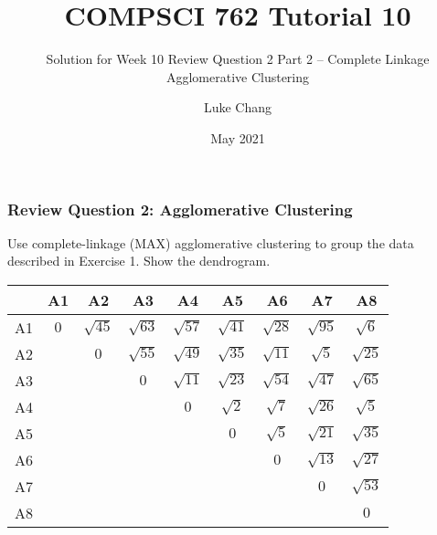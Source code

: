 \documentclass[aspectratio=169, 10pt]{beamer}
\title{COMPSCI 762 Tutorial 10}
\subtitle{Solution for Week 10 Review Question 2 Part 2 -- Complete Linkage Agglomerative Clustering}
\author{Luke Chang}
\institute{The University of Auckland}
\date{May 2021}
\begin{document}
\frame{\titlepage}

\begin{frame}[t]
    \frametitle{Review Question 2: Agglomerative Clustering}
    \small
    Use complete-linkage (MAX) agglomerative clustering to group the data described in Exercise 1. Show the dendrogram.
    \begin{table}[]
        \scriptsize
        \begin{tabular}{c|cccccccc}
           & A1 & A2 & A3 & A4 & A5 & A6 & A7 & A8 \\ \hline
        A1 & $0$  & $\sqrt{45}$ & $\sqrt{63}$ & $\sqrt{57}$ & $\sqrt{41}$ & $\sqrt{28}$ & $\sqrt{95}$ & $\sqrt{6}$ \\
        A2 &    & $0$  & $\sqrt{55}$ & $\sqrt{49}$ & $\sqrt{35}$ & $\sqrt{11}$ & $\sqrt{5}$  & $\sqrt{25}$ \\
        A3 &    &    & $0$  & $\sqrt{11}$ & $\sqrt{23}$ & $\sqrt{54}$ & $\sqrt{47}$ & $\sqrt{65}$ \\
        A4 &    &    &    & $0$  & $\sqrt{2}$  & $\sqrt{7}$  & $\sqrt{26}$ & $\sqrt{5}$  \\
        A5 &    &    &    &    & $0$  & $\sqrt{5}$  & $\sqrt{21}$ & $\sqrt{35}$ \\
        A6 &    &    &    &    &    & $0$  & $\sqrt{13}$ & $\sqrt{27}$ \\
        A7 &    &    &    &    &    &    & $0$  & $\sqrt{53}$ \\
        A8 &    &    &    &    &    &    &    & $0$ \\
        \end{tabular}
    \end{table}

\end{frame}
\end{document}
